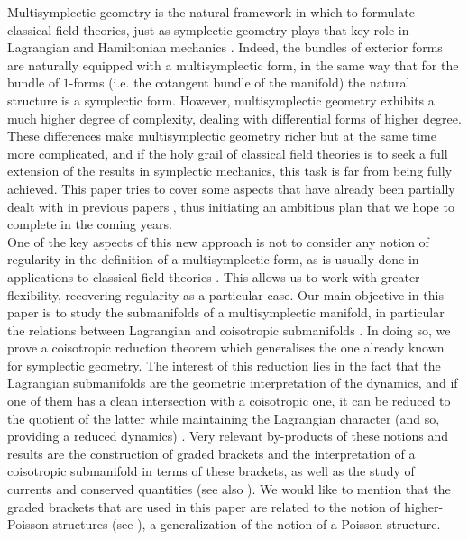 
Multisymplectic geometry is the natural framework in which to formulate classical field theories, just as symplectic geometry plays that key role in Lagrangian and Hamiltonian mechanics \cite{abraham2008foundations,ClassicalFieldsSniaiycki,dLR}. Indeed, the bundles of exterior forms are naturally equipped with a multisymplectic form, in the same way that for the bundle of $1$-forms (i.e. the cotangent bundle of the manifold) the natural structure is a symplectic form. However, multisymplectic geometry exhibits a much higher degree of complexity, dealing with differential forms of higher degree.  These differences make multisymplectic geometry richer but at the same time more complicated, and if the holy grail of classical field theories is to seek a full extension of the results in symplectic mechanics, this task is far from being fully achieved. This paper tries to cover some aspects that have already been partially dealt with in previous papers \cite{Ibort1999OnTG,HamiltonianStructuresIbort}, thus initiating an ambitious plan that we hope to complete in the coming years.\\

One of the key aspects of this new approach is not to consider any notion of regularity in the definition of a multisymplectic form, as is usually done in applications to classical field theories \cite{KdVequationGotay,GotayMultisymplecticFramework,MarkSpaceTimeDecomposition,Ibort1999OnTG,Roman_Roy_2009,NarcisoMultisymplecticFormalism,Invitation2019}. This allows us to work with greater flexibility, recovering regularity as a particular case. Our main objective in this paper is to study the submanifolds of a multisymplectic manifold, in particular the relations between Lagrangian and coisotropic submanifolds \cite{Ibort1999OnTG,deleon2003tulczyjews,Sevestre_2019}. In doing so, we prove a coisotropic reduction theorem which generalises the one already known for symplectic geometry. The interest of this reduction lies in the fact that the Lagrangian submanifolds are the geometric interpretation of the dynamics, and if one of them has a clean intersection with a coisotropic one, it can be reduced to the quotient of the latter while maintaining the Lagrangian character (and so, providing a reduced dynamics) \cite{WeinsteinLagrangianNeighborhood,abraham2008foundations}. Very relevant by-products of these notions and results are the construction of graded brackets and the interpretation of a coisotropic submanifold in terms of these brackets, as well as the study of currents and conserved quantities \cite{HamiltonianStructuresIbort,FORGER_2003,Blacker_2021} (see also \cite{AitorSymmetries,ConservedQuantitiesMarco}).
We would like to mention that the graded brackets that are used in this paper are related to the notion of higher-Poisson structures (see \cite{Bursztyn2015}), a generalization of the notion of a Poisson structure. \\

